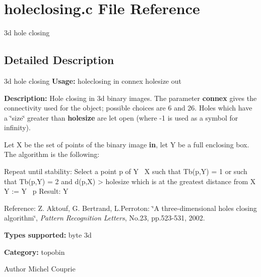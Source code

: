 \section{holeclosing.c File Reference}
\label{holeclosing_8c}


3d hole closing  




\subsection{Detailed Description}
3d hole closing {\bfseries Usage:} holeclosing in connex holesize out

{\bfseries Description:} Hole closing in 3d binary images. The parameter {\bfseries connex} gives the connectivity used for the object; possible choices are 6 and 26. Holes which have a \char`\"{}size\char`\"{} greater than {\bfseries holesize} are let open (where -\/1 is used as a symbol for infinity).

Let X be the set of points of the binary image {\bfseries in}, let Y be a full enclosing box. The algorithm is the following:

\begin{DoxyVerb}
Repeat until stability:
    Select a point p of Y \ X such that Tb(p,Y) = 1
        or such that Tb(p,Y) = 2 and d(p,X) > holesize
        which is at the greatest distance from X
    Y := Y \ {p}
Result: Y
\end{DoxyVerb}


Reference: Z. Aktouf, G. Bertrand, L.Perroton: \char`\"{}A three-\/dimensional holes closing algorithm\char`\"{}, {\itshape Pattern Recognition Letters\/}, No.23, pp.523-\/531, 2002.

{\bfseries Types supported:} byte 3d

{\bfseries Category:} topobin

\begin{DoxyAuthor}{Author}
Michel Couprie 
\end{DoxyAuthor}
